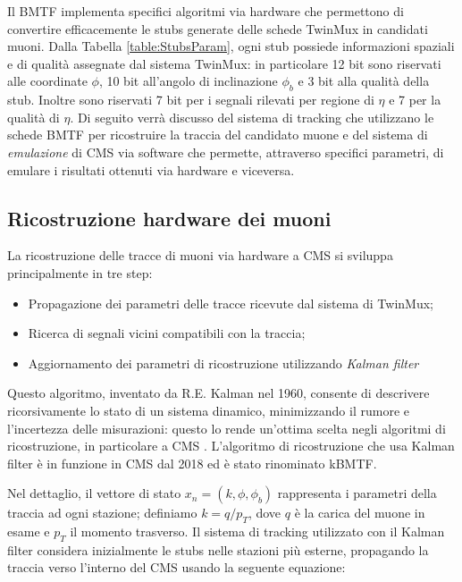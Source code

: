 Il BMTF implementa specifici algoritmi via hardware che permettono di convertire efficacemente le stubs generate delle schede TwinMux in candidati muoni. Dalla Tabella \ref{table:StubsParam}, ogni stub possiede informazioni spaziali e di qualità assegnate dal sistema TwinMux: in particolare 12 bit sono riservati alle coordinate $\phi$, 10 bit all'angolo di inclinazione $\phi_b$ e 3 bit alla qualità della stub. Inoltre sono riservati 7 bit per i segnali rilevati per regione di $\eta$ e 7 per la qualità di $\eta$. Di seguito verrà discusso del sistema di tracking che utilizzano le schede BMTF per ricostruire la traccia del candidato muone e del sistema di \textit{emulazione} di CMS via software che permette, attraverso specifici parametri, di emulare i risultati ottenuti via hardware e viceversa.

\subsection{Ricostruzione hardware dei muoni}
\label{sec:KalmannFilter}

La ricostruzione delle tracce di muoni via hardware a CMS si sviluppa principalmente in tre step: 
\begin{itemize}
  \item Propagazione dei parametri delle tracce ricevute dal sistema di TwinMux;
  \item Ricerca di segnali vicini compatibili con la traccia;
  \item Aggiornamento dei parametri di ricostruzione utilizzando \textit{Kalman filter} \cite{Summers:2728522}
\end{itemize}

Questo algoritmo, inventato da R.E. Kalman nel 1960, consente di descrivere ricorsivamente lo stato di un sistema dinamico, minimizzando il rumore e l'incertezza delle misurazioni: questo lo rende un'ottima scelta negli algoritmi di ricostruzione, in particolare a CMS \cite{welch1995introduction}. L'algoritmo di ricostruzione che usa Kalman filter è in funzione in CMS dal 2018 ed è stato rinominato kBMTF. 

Nel dettaglio, il vettore di stato $x_n = (k, \phi, \phi_b)$ rappresenta i parametri della traccia ad ogni stazione; definiamo $k = q/p_T$, dove $q$ è la carica del muone in esame e $p_T$ il momento trasverso. Il sistema di tracking utilizzato con il Kalman filter considera inizialmente le stubs nelle stazioni più esterne, propagando la traccia verso l'interno del CMS usando la seguente equazione:

